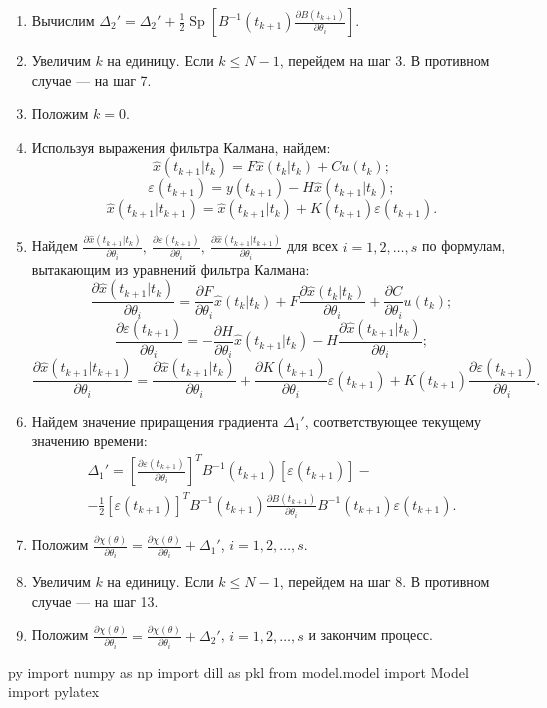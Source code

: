\documentclass[a4paper,14pt]{extarticle}
\DeclareMathOperator{\Sp}{Sp}
\newcommand{\pred}[0]{t_{k+1}|t_k}
\newcommand{\est}[0]{t_k|t_k}
\newcommand{\fut}[0]{t_{k+1}}
\newcommand{\estfut}[0]{t_{k+1}|t_{k+1}}
\newcommand{\pd}[2]{\frac{\partial #1}{\partial #2}}
\newcommand{\pdpk}[1]{\pd{#1}{\theta_i}}
\newcommand{\inv}[1]{#1^{-1}}
\newcommand{\eps}{\varepsilon}
\begin{document}
\begin{enumerate}
\item Вычислим $\Delta_2' = \Delta_2' + \frac{1}{2} \Sp \left[ \inv{B}(\fut)
\pdpk{B(\fut)} \right].$

\item Увеличим $k$ на единицу. Если $k \le N-1$, перейдем на шаг 3. В противном
случае --- на шаг 7.

\item Положим $k = 0$.

\item Используя выражения фильтра Калмана, найдем:
\[
  \hat{x}(\pred) = F \hat{x}(\est) + C u(t_k);
\]
\[
  \eps(\fut) = y(\fut) - H \hat{x}(\pred);
\]
\[
  \hat{x}(\estfut) = \hat{x}(\pred) + K(\fut) \eps(\fut).
\]

\item Найдем $\pdpk{\hat{x}(\pred)},\ \pdpk{\eps(\fut)},\
\pdpk{\hat{x}(\estfut)}$ для всех $i = 1, 2, \ldots, s$ по формулам, вытакающим
из уравнений фильтра Калмана:
\[
  \pdpk{\hat{x}(\pred)} = \pdpk{F} \hat{x}(\est) + F \pdpk{\hat{x}(\est)} +
  \pdpk{C} u(t_k);
\]
\[
  \pdpk{\eps(\fut)} = -\pdpk{H} \hat{x}(\pred) - H \pdpk{\hat{x}(\pred)};
\]
\[
  \pdpk{\hat{x}(\estfut)} = \pdpk{\hat{x}(\pred)} + \pdpk{K(\fut)} \eps(\fut) +
  K(\fut) \pdpk{\eps(\fut)}.
\]

\item Найдем значение приращения градиента $\Delta_1'$, соответствующее
текущему значению времени:
\begin{equation*}
\begin{split}
  \Delta_1' = \left[ \pdpk{\eps(\fut)} \right]^T \inv{B}(\fut)
  \left[ \eps(\fut) \right] - \\ - \frac{1}{2} \left[ \eps(\fut) \right]^T
  \inv{B}(\fut) \pdpk{B(\fut)} \inv{B}(\fut) \eps(\fut).
\end{split}
\end{equation*}

\item Положим $\pdpk{\chi(\theta)} = \pdpk{\chi(\theta)} + \Delta_1'$,
$i = 1, 2, \ldots, s$.

\item Увеличим $k$ на единицу. Если $k \le N-1$, перейдем на шаг 8.
В противном случае --- на шаг 13.

\item Положим $\pdpk{\chi(\theta)} = \pdpk{\chi(\theta)} + \Delta_2'$,
$i = 1, 2, \ldots, s$ и закончим процесс.

\end{enumerate}

\begin{pythontexcustomcode}{py}
import numpy as np
import dill as pkl
from model.model import Model
import pylatex
\end{pythontexcustomcode}
\end{document}
